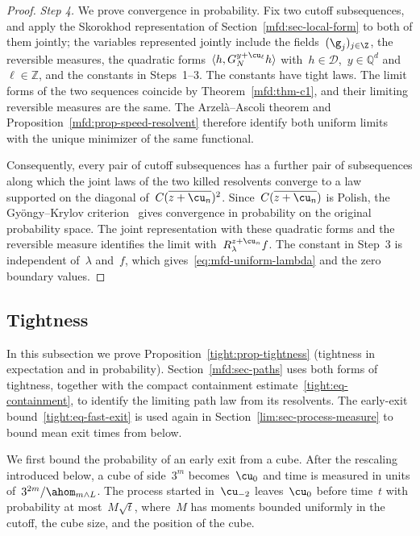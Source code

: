 \documentclass[11pt]{amsart}
\begin{document}
\begin{proof}
\smallskip

\emph{Step 4.} We prove convergence in probability. Fix two cutoff subsequences, and apply the Skorokhod representation of Section~\ref{mfd:sec-local-form} to both of them jointly; the variables represented jointly include the fields~$(\g_j)_{j\in\Z}$, the reversible measures, the quadratic forms~$\langle h,G_N^{y+\cu_\ell}h\rangle$ with~$h\in\mathcal D$,~$y\in\mathbb Q^d$ and~$\ell\in\mathbb Z$, and the constants in Steps~1--3. The constants have tight laws. The limit forms of the two sequences coincide by Theorem~\ref{mfd:thm-c1}, and their limiting reversible measures are the same. The Arzel\`a--Ascoli theorem and Proposition~\ref{mfd:prop-speed-resolvent} therefore identify both uniform limits with the unique minimizer of the same functional.

\smallskip

Consequently, every pair of cutoff subsequences has a further pair of subsequences along which the joint laws of the two killed resolvents converge to a law supported on the diagonal of~$C(\overline{z+\cu_n})^2$. Since~$C(\overline{z+\cu_n})$ is Polish, the Gy\"ongy--Krylov criterion~\citep[Lemma~1.1]{GyongyKrylov1996} gives convergence in probability on the original probability space. The joint representation with these quadratic forms and the reversible measure identifies the limit with~$R^{z+\cu_n}_\lambda f$. The constant in Step~3 is independent of~$\lambda$ and~$f$, which gives~\eqref{eq:mfd-uniform-lambda} and the zero boundary values.
\end{proof}

\subsection{Tightness}
\label{s.tightness}

In this subsection we prove Proposition~\ref{tight:prop-tightness} (tightness in expectation and in probability). Section~\ref{mfd:sec-paths} uses both forms of tightness, together with the compact containment estimate~\eqref{tight:eq-containment}, to identify the limiting path law from its resolvents. The early-exit bound~\eqref{tight:eq-fast-exit} is used again in Section~\ref{lim:sec-process-measure} to bound mean exit times from below.

\smallskip

We first bound the probability of an early exit from a cube. After the rescaling introduced below, a cube of side~$3^m$ becomes~$\cu_0$ and time is measured in units of~$3^{2m}/\ahom_{m\wedge L}$. The process started in~$\cu_{-2}$ leaves~$\cu_0$ before time~$t$ with probability at most~$M\sqrt t$, where~$M$ has moments bounded uniformly in the cutoff, the cube size, and the position of the cube.
\end{document}
